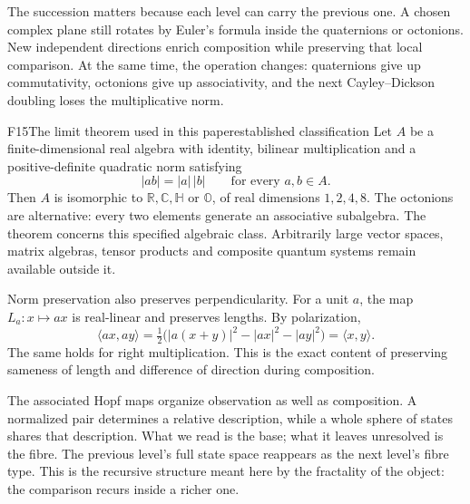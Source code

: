 \documentclass[11pt,a4paper]{article}
\newcommand{\R}{\mathbb{R}}
\newcommand{\C}{\mathbb{C}}
\newcommand{\HH}{\mathbb{H}}
\newcommand{\OO}{\mathbb{O}}
\begin{document}
The succession matters because each level can carry the previous one. A
chosen complex plane still rotates by Euler's formula inside the quaternions
or octonions. New independent directions enrich composition while preserving
that local comparison. At the same time, the operation changes: quaternions
give up commutativity, octonions give up associativity, and the next
Cayley--Dickson doubling loses the multiplicative norm.

\begin{formal}{F15}{The limit theorem used in this paper}{established classification}
Let $A$ be a finite-dimensional real algebra with identity, bilinear
multiplication and a positive-definite quadratic norm satisfying
\begin{equation}\label{eq:multiplicative-norm}
 |ab|=|a|\,|b|\qquad\text{for every }a,b\in A.
\end{equation}
Then $A$ is isomorphic to $\R,\C,\HH$ or $\OO$, of real dimensions
$1,2,4,8$. The octonions are alternative: every two elements generate an
associative subalgebra. The theorem concerns this specified algebraic class.
Arbitrarily large vector spaces, matrix algebras, tensor products and composite
quantum systems remain available outside it.

Norm preservation also preserves perpendicularity. For a unit $a$, the map
$L_a:x\mapsto ax$ is real-linear and preserves lengths. By polarization,
\begin{equation}
 \langle ax,ay\rangle
 =\tfrac12\bigl(|a(x+y)|^2-|ax|^2-|ay|^2\bigr)
 =\langle x,y\rangle.
\end{equation}
The same holds for right multiplication. This is the exact content of
preserving sameness of length and difference of direction during composition.
\end{formal}

The associated Hopf maps organize observation as well as composition. A
normalized pair determines a relative description, while a whole sphere of
states shares that description. What we read is the base; what it leaves
unresolved is the fibre. The previous level's full state space reappears as
the next level's fibre type. This is the recursive structure meant here by
the fractality of the object: the comparison recurs inside a richer one.
\end{document}
